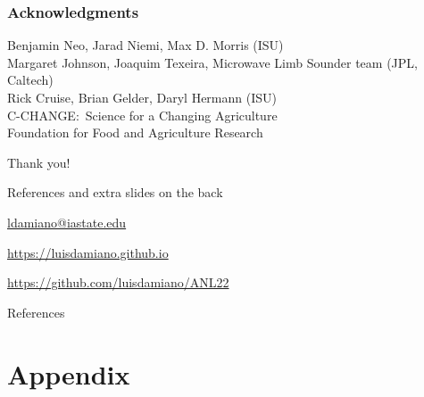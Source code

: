 \documentclass{snedecorbeamer}
\begin{document}
\begin{frame}[c]
  \frametitle{Acknowledgments}
  \centering

  {\small
    Benjamin Neo, Jarad Niemi, Max D. Morris (ISU) \\
    Margaret Johnson, Joaquim Texeira, Microwave Limb Sounder team
    (JPL, Caltech) \\
    Rick Cruise, Brian Gelder, Daryl Hermann (ISU) \\
    C-CHANGE:~Science for a Changing Agriculture \\
    Foundation for Food and Agriculture Research
  }

  \vfill

  {\huge Thank you!}

  \vfill

  {\tiny References and extra slides on the back}

  \href{ldamiano@iastate.edu}{
    ldamiano@iastate.edu}

  \href{https://luisdamiano.github.io}{
    https://luisdamiano.github.io}

  \href{https://github.com/luisdamiano/ANL22}{
    https://github.com/luisdamiano/ANL22}
\end{frame}

\begin{frame}[allowframebreaks]{References}
  \tiny
  
  
\end{frame}

\section{Appendix}
\end{document}
